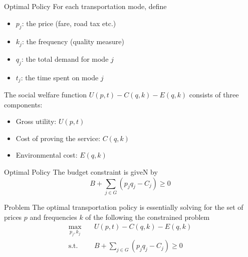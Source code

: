 \documentclass[10pt, aspectratio=169]{beamer}
\begin{document}
\begin{frame}{Optimal Policy}
  For each transportation mode, define
  \begin{itemize}
    \item $p_j$: the price (fare, road tax etc.)
    \item $k_j$: the frequency (quality measure)
    \item $q_j$: the total demand for mode $j$
    \item $t_j$: the time spent on mode $j$
  \end{itemize}
  The social welfare function $U(p,t)-C(q,k)-E(q,k)$ consists of three components:
  \begin{itemize}
    \item Gross utility: $U(p,t)$
    \item Cost of proving the service: $C(q,k)$
    \item Environmental cost: $E(q,k)$
  \end{itemize}

\end{frame}

\begin{frame}{Optimal Policy}
  The budget constraint is giveN by
  \begin{equation*}
    B+\sum_{j\in G} (p_j q_j - C_j)\ge 0
  \end{equation*}
  \begin{block}{Problem}
    The optimal transportation policy is essentially solving for the set of \alert{ prices $p$ and frequencies $k$} of the following the constrained problem
    \begin{equation*}
      \begin{split}
        \max_{p_j,k_j} & \quad U(p,t)-C(q,k)-E(q,k)                 \\
        \text{s.t.}    & \quad B+\sum_{j\in G} (p_j q_j - C_j)\ge 0
      \end{split}
    \end{equation*}
  \end{block}
\end{frame}
\end{document}
